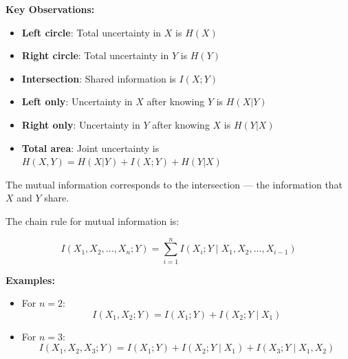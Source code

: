 \documentclass[11pt,a4paper]{book}
\newenvironment{formulabox}[1][Formula]{
    \begin{tcolorbox}[
        enhanced,
        breakable,
        colback=softcoral!10,
        colframe=softcoral!200,
        title=#1,
        fonttitle=\bfseries,
        coltitle=white,
        sharp corners,
        boxrule=1pt,
        left=8pt,
        right=8pt,
        top=6pt,
        bottom=6pt
    ]
}{
    \end{tcolorbox}
}
\begin{document}
\textbf{Key Observations:}
\begin{itemize}
    \item \textbf{Left circle}: Total uncertainty in \(X\) is \(H(X)\)
    \item \textbf{Right circle}: Total uncertainty in \(Y\) is \(H(Y)\)
    \item \textbf{Intersection}: Shared information is \(I(X;Y)\)
    \item \textbf{Left only}: Uncertainty in \(X\) after knowing \(Y\) is \(H(X|Y)\)
    \item \textbf{Right only}: Uncertainty in \(Y\) after knowing \(X\) is \(H(Y|X)\)
    \item \textbf{Total area}: Joint uncertainty is \(H(X,Y) = H(X|Y) + I(X;Y) + H(Y|X)\)
\end{itemize}

The mutual information corresponds to the intersection — the information that \(X\) and \(Y\) share.

\begin{formulabox}[Chain Rule for Mutual Information]

The chain rule for mutual information is:

\[
I(X_1, X_2, \ldots, X_n ; Y)
= \sum_{i=1}^{n} I\!\left(X_i ; Y \mid X_1, X_2, \ldots, X_{i-1}\right)
\]

\textbf{Examples:}

\begin{itemize}
    \item For \(n = 2\):
    \[
        I(X_1, X_2 ; Y)
        = I(X_1 ; Y) + I(X_2 ; Y \mid X_1)
    \]

    \item For \(n = 3\):
    \[
        I(X_1, X_2, X_3 ; Y)
        = I(X_1 ; Y)
        + I(X_2 ; Y \mid X_1)
        + I(X_3 ; Y \mid X_1, X_2)
    \]
\end{itemize}

\end{formulabox}
\end{document}

